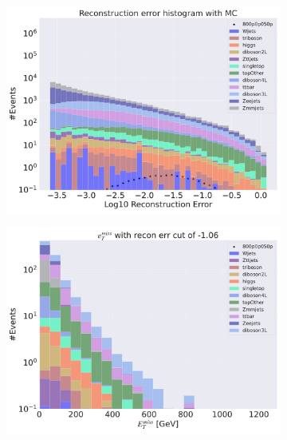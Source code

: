 \begin{figure}[H]
    \centering
    \begin{subfigure}{.49\textwidth}
        \includegraphics[width=\textwidth]{Figures/AE_testing/small/3lep/b_data_recon_big_rm3_feats_sig_800p0p050p.pdf}
        \caption{ }
        \label{fig:AE_3lep_small_800_2}
    \end{subfigure}
    \hfill
    \begin{subfigure}{.49\textwidth}
        \includegraphics[width=\textwidth]{Figures/AE_testing/small/3lep/b_data_recon_big_rm3_feats_sig_800p0p050p_etmiss_recon_errcut_-1.06.pdf}
        \caption{}
        \label{fig:AE_3lep_small_etmiss_800_2}
    \end{subfigure}

\end{figure}
